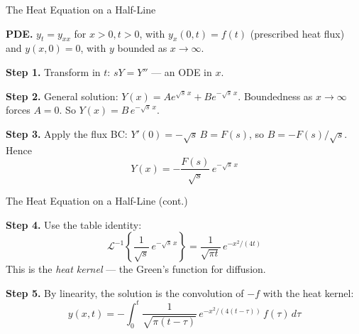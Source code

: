 \documentclass[aspectratio=169,11pt]{beamer}
\begin{document}
\begin{frame}{The Heat Equation on a Half-Line}
\footnotesize
\begin{examplebox}
\textbf{PDE.} $y_t = y_{xx}$ for $x > 0, t > 0$, with $y_x(0,t) = f(t)$ (prescribed heat flux) and $y(x,0) = 0$, with $y$ bounded as $x \to \infty$.

\textbf{Step 1.} Transform in $t$: $sY = Y''$ --- an ODE in $x$.

\textbf{Step 2.} General solution: $Y(x) = A e^{\sqrt{s}\,x} + B e^{-\sqrt{s}\,x}$. Boundedness as $x \to \infty$ forces $A = 0$. So $Y(x) = B\, e^{-\sqrt{s}\,x}$.

\textbf{Step 3.} Apply the flux BC: $Y'(0) = -\sqrt{s}\, B = F(s)$, so $B = -F(s)/\sqrt{s}$. Hence
\[Y(x) = -\frac{F(s)}{\sqrt{s}}\, e^{-\sqrt{s}\,x}\]
\end{examplebox}
\end{frame}

\begin{frame}{The Heat Equation on a Half-Line (cont.)}
\footnotesize
\begin{examplebox}
\textbf{Step 4.} Use the table identity:
\[\mathcal{L}^{-1}\!\left\{\frac{1}{\sqrt{s}}\, e^{-\sqrt{s}\,x}\right\} = \frac{1}{\sqrt{\pi t}}\, e^{-x^2/(4t)}\]
This is the \emph{heat kernel} --- the Green's function for diffusion.

\textbf{Step 5.} By linearity, the solution is the convolution of $-f$ with the heat kernel:
\[y(x,t) = -\int_0^t \frac{1}{\sqrt{\pi(t-\tau)}}\, e^{-x^2/(4(t-\tau))}\, f(\tau)\, d\tau\]
\end{examplebox}
\end{frame}
\end{document}
